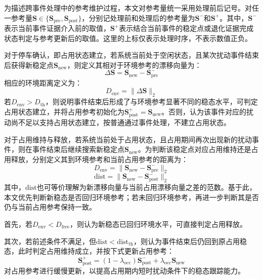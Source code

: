 \documentclass{xdupgthesis}
\begin{document}
为描述跨事件处理中的参考维护过程，本文对参考量统一采用处理前后记号。对任一参考量$\mathbf{S}\in\{\mathbf{S}_{\mathrm{pre}},\mathbf{S}_{\mathrm{post}}\}$，分别记处理前和处理后的参考量为$\mathbf{S}^{-}$和$\mathbf{S}^{+}$。其中，$\mathbf{S}^{-}$表示当前事件证据介入前的取值，$\mathbf{S}^{+}$表示结合当前事件的稳定点或退化证据完成状态判定与参考更新后的取值。这里的上标仅表示处理时序，不表示数值正负。

对于停车确认，即占用状态建立，若系统当前处于空闲状态，且某次扰动事件结束后获得新稳定点$\mathbf{S}_{\mathrm{new}}$，则定义其相对于环境参考的漂移向量为：
\begin{equation}
    \Delta\mathbf{S}=\mathbf{S}_{\mathrm{new}}-\mathbf{S}_{\mathrm{pre}}^{-}
\end{equation}
相应的环境距离定义为：
\begin{equation}
    D_{\mathrm{env}}=\lVert\Delta\mathbf{S}\rVert_2
\end{equation}
若$D_{\mathrm{env}}>D_{\mathrm{th}}$，则说明事件结束后形成了与环境参考显著不同的稳态水平，可判定占用状态建立，并将占用参考初始化为$\mathbf{S}_{\mathrm{post}}^{+}=\mathbf{S}_{\mathrm{new}}$。否则，认为该事件对应的扰动尚不足以支持占用状态建立，按普通通过事件处理，不建立占用状态。

对于占用维持与释放，若系统当前处于占用状态，且占用期间再次出现新的扰动事件，则在事件结束后继续搜索新稳定点$\mathbf{S}_{\mathrm{new}}$。为判断该稳定点对应占用维持还是占用释放，分别定义其到环境参考和当前占用参考的距离为：
\begin{equation}
    D_{\mathrm{env}}=\lVert\mathbf{S}_{\mathrm{new}}-\mathbf{S}_{\mathrm{pre}}^{-}\rVert_2
\end{equation}
\begin{equation}
    \mathrm{dist}=\lVert\mathbf{S}_{\mathrm{new}}-\mathbf{S}_{\mathrm{post}}^{-}\rVert_2
\end{equation}
其中，$\mathrm{dist}$也可等价理解为新漂移向量与当前占用漂移向量之差的范数。基于此，本文优先判断新稳态是否回归环境参考；若未回归环境参考，再进一步判断其是否仍与当前占用参考保持一致。

首先，若$D_{\mathrm{env}}<D_{\mathrm{free}}$，则认为新稳态已回归环境水平，可直接判定占用释放。

其次，若前述条件不满足，但$\mathrm{dist}<\mathrm{dist}_{\mathrm{th}}$，则认为事件结束后仍回到原占用稳态，此时判定占用维持成立，并按下式更新占用参考：
\begin{equation}
    \mathbf{S}_{\mathrm{post}}^{+}=(1-\lambda_{\mathrm{occ}})\mathbf{S}_{\mathrm{post}}^{-}
    +\lambda_{\mathrm{occ}}\mathbf{S}_{\mathrm{new}}
\end{equation}
对占用参考进行缓慢更新，以提高占用期内短时扰动条件下的稳态跟踪能力。
\end{document}
